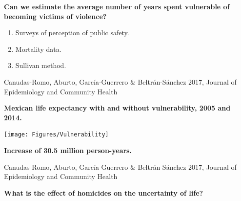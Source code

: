 \documentclass[xcolor={dvipsnames}]{beamer}
\begin{document}
\begin{frame}
	\LARGE{
		\begin{center}	
		\textbf{Can we estimate the average number of years spent vulnerable of becoming victims of violence?}
		\end{center} 
		
		\pause
		
		\begin{enumerate}
		
		\item Surveys of perception of public safety.

		\item Mortality data.
		
		\item Sullivan method.
		
						
		\end{enumerate}
	
		}
		\tiny{Canudas-Romo, Aburto, Garc\'ia-Guerrero \& Beltr\'an-S\'anchez 2017, Journal of Epidemiology and Community Health}
\end{frame}

%	
%

\begin{frame}
	\Large{
	\begin{center}
			\textbf{Mexican life expectancy with and without vulnerability, 2005 and 2014.}
	\end{center}
	
	\begin{center}
		\texttt{[image: Figures/Vulnerability]}
		
		\pause
		
		\textbf{Increase of 30.5 million person-years.}
	\end{center}
		}
		
	\tiny{Canudas-Romo, Aburto, Garc\'ia-Guerrero \& Beltr\'an-S\'anchez 2017, Journal of Epidemiology and Community Health}
\end{frame}


\begin{frame}
	\huge{
		\begin{center}
		
		\textbf{What is the effect of homicides on the uncertainty of life?}
		
		\end{center}		

	}
\end{frame}
\end{document}
